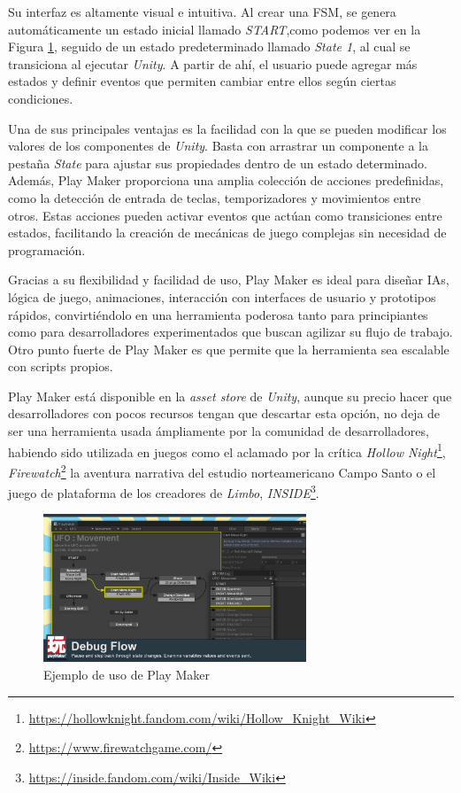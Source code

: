Su interfaz es altamente visual e intuitiva. Al crear una FSM, se genera automáticamente un estado inicial llamado \textit{START},como podemos ver en la Figura \ref{fig:PlayMaker_Figure}, seguido de un estado predeterminado llamado \textit{State 1}, al cual se transiciona al ejecutar \textit{Unity}. A partir de ahí, el usuario puede agregar más estados y definir eventos que permiten cambiar entre ellos según ciertas condiciones.

Una de sus principales ventajas es la facilidad con la que se pueden modificar los valores de los componentes de \textit{Unity}. Basta con arrastrar un componente a la pestaña \textit{State} para ajustar sus propiedades dentro de un estado determinado. Además, Play Maker proporciona una amplia colección de acciones predefinidas, como la detección de entrada de teclas, temporizadores y movimientos entre otros. Estas acciones pueden activar eventos que actúan como transiciones entre estados, facilitando la creación de mecánicas de juego complejas sin necesidad de programación.

Gracias a su flexibilidad y facilidad de uso, Play Maker es ideal para diseñar IAs, lógica de juego, animaciones, interacción con interfaces de usuario y prototipos rápidos, convirtiéndolo en una herramienta poderosa tanto para principiantes como para desarrolladores experimentados que buscan agilizar su flujo de trabajo. Otro punto fuerte de Play Maker es que permite que la herramienta sea escalable con scripts propios.

Play Maker está disponible en la \textit{asset store} de \textit{Unity}, aunque su precio hacer que desarrolladores con pocos recursos tengan que descartar esta opción, no deja de ser una herramienta usada ámpliamente por la comunidad de desarrolladores, habiendo sido utilizada en juegos como el aclamado por la crítica \textit{Hollow Night}\footnote{\url{https://hollowknight.fandom.com/wiki/Hollow_Knight_Wiki}}, \textit{Firewatch}\footnote{\url{https://www.firewatchgame.com/}} la aventura narrativa del estudio norteamericano Campo Santo o el juego de plataforma de los creadores de \textit{Limbo}, \textit{INSIDE}\footnote{\url{https://inside.fandom.com/wiki/Inside_Wiki}}.\\

\begin{figure}[t]
	\centering
	\includegraphics[width = 0.7\textwidth]{Imagenes/PlayMaker.jpg}
	\caption{Ejemplo de uso de Play Maker}
	\label{fig:PlayMaker_Figure}
\end{figure}

